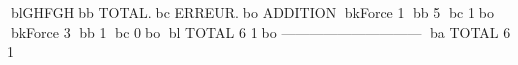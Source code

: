 blGHFGHbb           TOTAL.bc      ERREUR.bo
ADDITION
bkForce      1     bb  5	bc        1bo
bkForce      3     bb  1	bc        0bo
bl TOTAL             6	        1bo
------------------------------
ba TOTAL             6	        1
